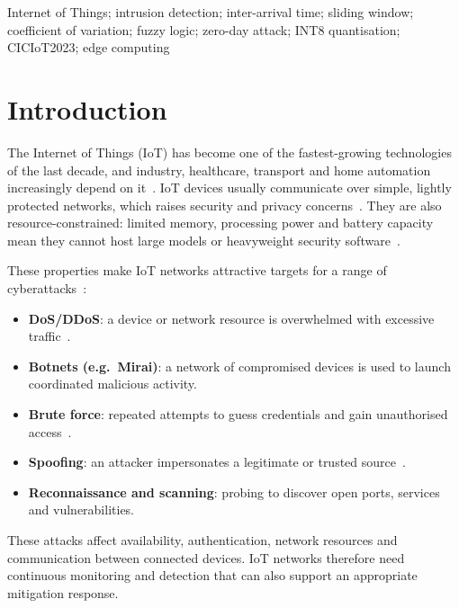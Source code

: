 \documentclass[]{interact}
\theoremstyle{plain}
\theoremstyle{definition}
\begin{document}
\begin{keywords}
Internet of Things; intrusion detection; inter-arrival time; sliding window; coefficient of variation; fuzzy logic; zero-day attack; INT8 quantisation; CICIoT2023; edge computing
\end{keywords}

\section{Introduction}

The Internet of Things (IoT) has become one of the fastest-growing technologies of the last decade, and industry, healthcare, transport and home automation increasingly depend on it~\citep{rekha2023,jing2014}. IoT devices usually communicate over simple, lightly protected networks, which raises security and privacy concerns~\citep{yang2017}. They are also resource-constrained: limited memory, processing power and battery capacity mean they cannot host large models or heavyweight security software~\citep{hamad2020}.

These properties make IoT networks attractive targets for a range of cyberattacks~\citep{jahangeer2023}:
\begin{itemize}
  \item \textbf{DoS/DDoS}: a device or network resource is overwhelmed with excessive traffic~\citep{pakmehr2024}.
  \item \textbf{Botnets (e.g.\ Mirai)}: a network of compromised devices is used to launch coordinated malicious activity.
  \item \textbf{Brute force}: repeated attempts to guess credentials and gain unauthorised access~\citep{volety2019}.
  \item \textbf{Spoofing}: an attacker impersonates a legitimate or trusted source~\citep{babu2010}.
  \item \textbf{Reconnaissance and scanning}: probing to discover open ports, services and vulnerabilities.
\end{itemize}
These attacks affect availability, authentication, network resources and communication between connected devices. IoT networks therefore need continuous monitoring and detection that can also support an appropriate mitigation response.
\end{document}
